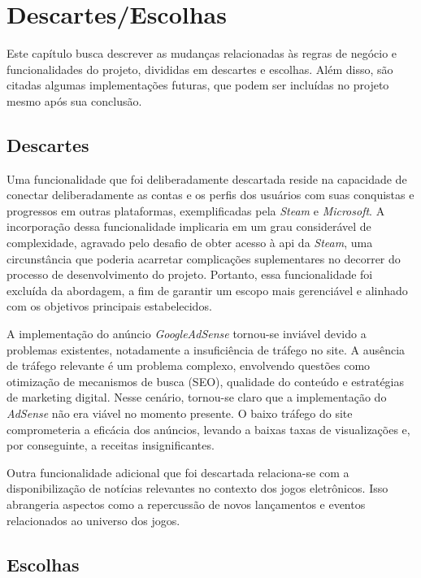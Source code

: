 \chapter{Descartes/Escolhas}

Este capítulo busca descrever as mudanças relacionadas às regras de negócio e funcionalidades do projeto, divididas em descartes e escolhas. Além disso, são citadas algumas implementações futuras, que podem ser incluídas no projeto mesmo após sua conclusão.

\section{Descartes}

Uma funcionalidade que foi deliberadamente descartada reside na capacidade de conectar deliberadamente as contas e os perfis dos usuários com suas conquistas e progressos em outras plataformas, exemplificadas pela \textit{\gls{Steam}} e \textit{\gls{Microsoft}}. A incorporação dessa funcionalidade implicaria em um grau considerável de complexidade, agravado pelo desafio de obter acesso à \ac{api} da \textit{\gls{Steam}}, uma circunstância que poderia acarretar complicações suplementares no decorrer do processo de desenvolvimento do projeto. Portanto, essa funcionalidade foi excluída da abordagem, a fim de garantir um escopo mais gerenciável e alinhado com os objetivos principais estabelecidos.

A implementação do anúncio \textit{\gls{GoogleAdSense}} tornou-se inviável devido a problemas existentes, notadamente a insuficiência de tráfego no site. A ausência de tráfego relevante é um problema complexo, envolvendo questões como otimização de mecanismos de busca (SEO), qualidade do conteúdo e estratégias de marketing digital. Nesse cenário, tornou-se claro que a implementação do \textit{AdSense} não era viável no momento presente. O baixo tráfego do site comprometeria a eficácia dos anúncios, levando a baixas taxas de visualizações e, por conseguinte, a receitas insignificantes.

Outra funcionalidade adicional que foi descartada relaciona-se com a disponibilização de notícias relevantes no contexto dos jogos eletrônicos. Isso abrangeria aspectos como a repercussão de novos lançamentos e eventos relacionados ao universo dos jogos.

\section{Escolhas}

